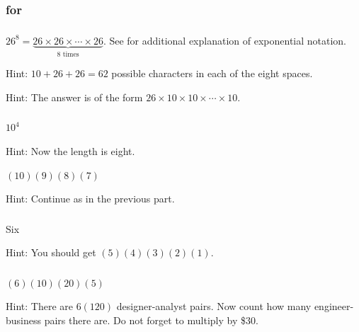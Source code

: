 \subsubsection{\answers for 
 \substepscases}

\subsubsection*{ \answers}
\begin{apart}
    \item  $26^8 = \underbrace{26 \times 26 \times \cdots \times 26}_{8 \text{ times}}$. See  for additional explanation of exponential notation.
    \item Hint: $10+26+26 = 62$ possible characters in each of the eight spaces.
    \item Hint: The answer is of the form $26 \times 10 \times 10 \times \cdots \times 10$.
\end{apart}

\subsubsection*{ \answers}
    \begin{apart}
        \item $10^4$
        \item Hint: Now the length is eight.
        \item $(10)(9)(8)(7)$
        \item Hint: Continue as in the previous part.
    \end{apart}
    
\subsubsection*{ \answers}
    \begin{apart}
        \item Six
        \item Hint: You should get $(5)(4)(3)(2)(1)$.
    \end{apart}
    
\subsubsection*{ \answers}
     \begin{apart}
         \item $(6)(10)(20)(5)$
         \item Hint: There are $6(120)$ designer-analyst pairs. Now count how many engineer-business pairs there are. Do not forget to multiply by \$30.
     \end{apart}
     
